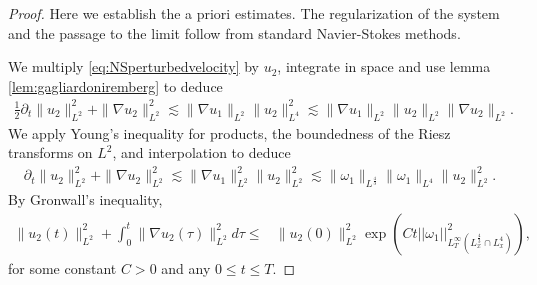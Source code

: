 \documentclass[11pt,a4paper]{article}
\newcommand{\w}{\omega}
\newcommand{\pa}{\partial}
\newcommand{\na}{\nabla}
\newcommand{\norm}[1]{\|#1\|}
\begin{document}
\begin{proof}
Here we establish the a priori estimates. The regularization of the system and the passage to the limit follow from standard Navier-Stokes methods. 

We multiply \eqref{eq:NSperturbedvelocity} by $u_2$, integrate in space and use lemma \ref{lem:gagliardoniremberg} to deduce
$$
\begin{aligned}
\frac{1}{2}\pa_t\norm{u_2}^2_{L^2}+\norm{\na u_2}_{L^2}^2\lesssim  
\norm{\na u_1}_{L^2}\norm{u_2}_{L^4}^2
\lesssim \norm{\na u_1}_{L^2}\norm{u_2}_{L^2}\norm{\na u_2}_{L^2}.
\end{aligned}$$
We apply Young's inequality for products, the boundedness of the Riesz transforms on $L^2$, and interpolation to deduce
$$
\begin{aligned}
\pa_t\norm{u_2}^2_{L^2}+\norm{\na u_2}_{L^2}^2
\lesssim \norm{\na u_1}^2_{L^2}\norm{u_2}^2_{L^2}\lesssim\norm{\w_1}_{L^{\frac43}}\norm{\w_1}_{L^{4}}\norm{u_2}^2_{L^2}.
\end{aligned}$$
By Gronwall's inequality, 
\begin{equation}\label{LinfL2L2H1exp}
    \begin{aligned}
\norm{u_2(t)}^2_{L^2}+\int_0^t\norm{\na u_2(\tau)}_{L^2}^2d\tau\leq& \norm{u_2(0)}^2_{L^2} \exp(Ct ||\w _1||^2_{L^\infty_T(L_x^\frac{4}{3}\cap L_x^4)}),   
\end{aligned}
\end{equation}
for some constant $C>0$ and any $0\leq t\leq T$. 


\end{proof}
\end{document}
